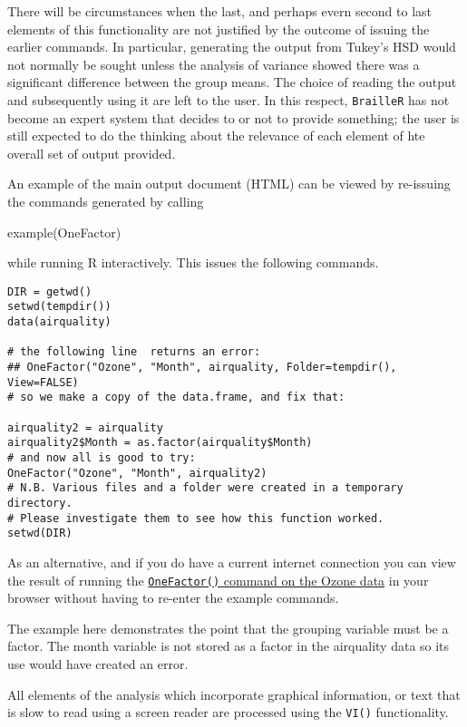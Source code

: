 \documentclass[
]{book}
\newenvironment{Shaded}{\begin{snugshade}}{\end{snugshade}}
\newcommand{\FunctionTok}[1]{\textcolor[rgb]{0.00,0.00,0.00}{#1}}
\newcommand{\NormalTok}[1]{#1}
\begin{document}
There will be circumstances when the last, and perhaps evern second to last elements of this functionality are not justified by the outcome of issuing the earlier commands. In particular, generating the output from Tukey's HSD would not normally be sought unless the analysis of variance showed there was a significant difference between the group means. The choice of reading the output and subsequently using it are left to the user. In this respect, \texttt{BrailleR} has not become an expert system that decides to or not to provide something; the user is still expected to do the thinking about the relevance of each element of hte overall set of output provided.

An example of the main output document (HTML) can be viewed by re-issuing the commands generated by calling

\begin{Shaded}
\begin{Highlighting}[]
\FunctionTok{example}\NormalTok{(OneFactor)}
\end{Highlighting}
\end{Shaded}

while running R interactively. This issues the following commands.

\begin{verbatim}
DIR = getwd()
setwd(tempdir())
data(airquality)

# the following line  returns an error:
## OneFactor("Ozone", "Month", airquality, Folder=tempdir(), View=FALSE)
# so we make a copy of the data.frame, and fix that:

airquality2 = airquality
airquality2$Month = as.factor(airquality$Month)
# and now all is good to try:
OneFactor("Ozone", "Month", airquality2)
# N.B. Various files and a folder were created in a temporary directory. 
# Please investigate them to see how this function worked.
setwd(DIR)
\end{verbatim}

As an alternative, and if you do have a current internet connection you can view the result of running the \href{https://R-Resources.massey.ac.nz/BrailleRInAction/Ozone.Month-OneFactor.html}{\texttt{OneFactor()} command on the Ozone data} in your browser without having to re-enter the example commands.

The example here demonstrates the point that the grouping variable must be a factor. The month variable is not stored as a factor in the airquality data so its use would have created an error.

All elements of the analysis which incorporate graphical information, or text that is slow to read using a screen reader are processed using the \texttt{VI()} functionality.
\end{document}
